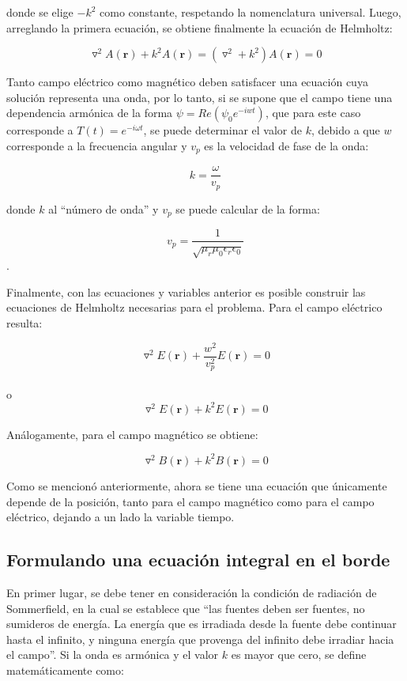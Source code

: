 \documentclass[12pt,letterpaper]{article}
\numberwithin{equation}{section}
\begin{document}
\noindent donde se elige $-k^2$ como constante, respetando la nomenclatura universal. Luego, arreglando la primera ecuación, se obtiene finalmente la ecuación de Helmholtz:

\begin{equation}
\triangledown^2A(\textbf{r})+k^2A(\textbf{r})=(\triangledown^2 + k^2)A(\textbf{r}) =0
\label{eq: ecuacion de helmholtz}
\end{equation}

Tanto campo eléctrico como magnético deben satisfacer una ecuación cuya solución representa una onda, por lo tanto, si se supone que el campo tiene una dependencia armónica de la forma $\psi = Re(\psi_{0}e^{-iwt})$, que para este caso corresponde a $T(t) = e^{-i\omega t}$, se puede determinar el valor de $k$, debido a que $w$ corresponde a la frecuencia angular y $v_{p}$ es la velocidad de fase de la onda:

$$k=\frac{\omega}{v_p}$$

\noindent donde $k$ al ``número de onda'' y $v_p$ se puede calcular de la forma:

$$v_p = \frac{1}{\sqrt{\mu_r\mu_0\epsilon_r\epsilon_0}}$$.

Finalmente, con las ecuaciones y variables anterior es posible construir las ecuaciones de Helmholtz necesarias para el problema. Para el campo eléctrico resulta:

\begin{equation*}
\triangledown^2E(\textbf{r})+\frac{w^2}{v_{p}^2}E(\textbf{r})=0
\end{equation*}
\\
o
\\
\begin{equation}
\triangledown^2E(\textbf{r})+k^2E(\textbf{r})=0
\label{eq:Helmholtz electrico}
\end{equation}

Análogamente, para el campo magnético se obtiene:

\begin{equation}
\triangledown^2B(\textbf{r})+k^2B(\textbf{r})=0
\label{eq:Helmholtz magnetico}
\end{equation}


Como se mencionó anteriormente, ahora se tiene una ecuación que únicamente depende de la posición, tanto para el campo magnético como para el campo eléctrico, dejando a un lado la variable tiempo.

\subsection{Formulando una ecuación integral en el borde}
En primer lugar, se debe tener en consideración la condición de radiación de Sommerfield, en la cual se establece que ``las fuentes deben ser fuentes, no sumideros de energía. La energía que es irradiada desde la fuente debe continuar hasta el infinito, y ninguna energía que provenga del infinito debe irradiar hacia el campo''. Si la onda es armónica y el valor $k$ es mayor que cero, se define matemáticamente como:
\end{document}
